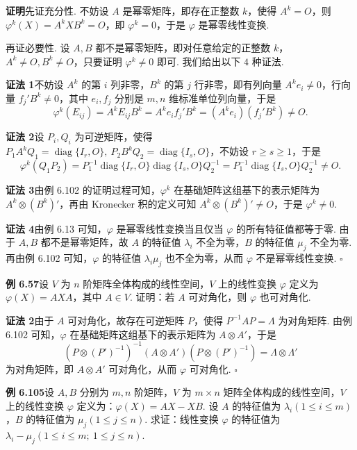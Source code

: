\documentclass[UTF8, 12pt, fontset=fandol, oneside]{ctexart}
\begin{document}
\noindent\textbf{证明}\quad 先证充分性. 不妨设 $A$ 是幂零矩阵，即存在正整数 $k$，使得 $A^k=O$，则 $\varphi^k(X)=A^kXB^k=O$，即 $\varphi^k=0$，于是 $\varphi$ 是幂零线性变换.

再证必要性. 设 $A,B$ 都不是幂零矩阵，即对任意给定的正整数 $k$，$A^k\ne O,B^k\ne O$，只要证明 $\varphi^k\ne 0$ 即可. 我们给出以下 $4$ 种证法.

\noindent\textbf{证法 1}\quad 不妨设 $A^k$ 的第 $i$ 列非零，$B^k$ 的第 $j$ 行非零，即有列向量 $A^ke_i\ne 0$，行向量 $f_j'B^k\ne 0$，其中 $e_i,f_j$ 分别是 $m,n$ 维标准单位列向量，于是
\[
\varphi^k(E_{ij})=A^kE_{ij}B^k=A^ke_if_j'B^k=(A^ke_i)(f_j'B^k)\ne O.
\]

\noindent\textbf{证法 2}\quad 设 $P_i,Q_i$ 为可逆矩阵，使得 $P_1A^kQ_1=\operatorname{diag}\{I_r,O\},\ P_2B^kQ_2=\operatorname{diag}\{I_s,O\}$，不妨设 $r\ge s\ge 1$，于是
\[
\varphi^k(Q_1P_2)=P_1^{-1}\operatorname{diag}\{I_r,O\}\operatorname{diag}\{I_s,O\}Q_2^{-1}=P_1^{-1}\operatorname{diag}\{I_s,O\}Q_2^{-1}\ne O.
\]

\noindent\textbf{证法 3}\quad 由例 6.102 的证明过程可知，$\varphi^k$ 在基础矩阵这组基下的表示矩阵为 $A^k\otimes(B^k)'$，再由 Kronecker 积的定义可知 $A^k\otimes(B^k)'\ne O$，于是 $\varphi^k\ne 0$.

\noindent\textbf{证法 4}\quad 由例 6.13 可知，$\varphi$ 是幂零线性变换当且仅当 $\varphi$ 的所有特征值都等于零. 由于 $A,B$ 都不是幂零矩阵，故 $A$ 的特征值 $\lambda_i$ 不全为零，$B$ 的特征值 $\mu_j$ 不全为零. 再由例 6.102 可知，$\varphi$ 的特征值 $\lambda_i\mu_j$ 也不全为零，从而 $\varphi$ 不是幂零线性变换. $\square$

\noindent\textbf{例 6.57}\quad 设 $V$ 为 $n$ 阶矩阵全体构成的线性空间，$V$ 上的线性变换 $\varphi$ 定义为 $\varphi(X)=AXA$，其中 $A\in V$. 证明：若 $A$ 可对角化，则 $\varphi$ 也可对角化.

\noindent\textbf{证法 2}\quad 由于 $A$ 可对角化，故存在可逆矩阵 $P$，使得 $P^{-1}AP=\Lambda$ 为对角矩阵. 由例 6.102 可知，$\varphi$ 在基础矩阵这组基下的表示矩阵为 $A\otimes A'$，于是
\[
(P\otimes(P')^{-1})^{-1}(A\otimes A')(P\otimes(P')^{-1})=\Lambda\otimes\Lambda'
\]
为对角矩阵，即 $A\otimes A'$ 可对角化，从而 $\varphi$ 可对角化. $\square$

\noindent\textbf{例 6.105}\quad 设 $A,B$ 分别为 $m,n$ 阶矩阵，$V$ 为 $m\times n$ 矩阵全体构成的线性空间，$V$ 上的线性变换 $\varphi$ 定义为：$\varphi(X)=AX-XB$. 设 $A$ 的特征值为 $\lambda_i(1\le i\le m)$，$B$ 的特征值为 $\mu_j(1\le j\le n)$. 求证：线性变换 $\varphi$ 的特征值为 $\lambda_i-\mu_j(1\le i\le m;\ 1\le j\le n)$.
\end{document}
